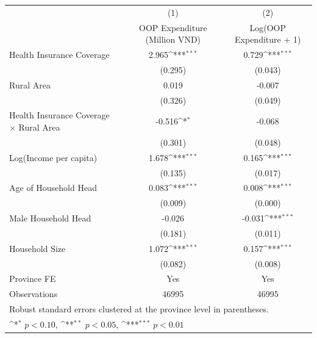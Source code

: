 {
\def\sym#1{\ifmmode^{#1}\else\(^{#1}\)\fi}
\begin{tabular}{l*{2}{c}}
\hline\hline
                    &\multicolumn{1}{c}{(1)}&\multicolumn{1}{c}{(2)}\\
                    &\multicolumn{1}{c}{OOP Expenditure (Million VND)}&\multicolumn{1}{c}{Log(OOP Expenditure + 1)}\\
\hline
Health Insurance Coverage&       2.965\sym{***}&       0.729\sym{***}\\
                    &     (0.295)         &     (0.043)         \\
[1em]
Rural Area          &       0.019         &      -0.007         \\
                    &     (0.326)         &     (0.049)         \\
[1em]
Health Insurance Coverage $\times$ Rural Area&      -0.516\sym{*}  &      -0.068         \\
                    &     (0.301)         &     (0.048)         \\
[1em]
Log(Income per capita)&       1.678\sym{***}&       0.165\sym{***}\\
                    &     (0.135)         &     (0.017)         \\
[1em]
Age of Household Head&       0.083\sym{***}&       0.008\sym{***}\\
                    &     (0.009)         &     (0.000)         \\
[1em]
Male Household Head &      -0.026         &      -0.031\sym{***}\\
                    &     (0.181)         &     (0.011)         \\
[1em]
Household Size      &       1.072\sym{***}&       0.157\sym{***}\\
                    &     (0.082)         &     (0.008)         \\
[1em]
Province FE         &         Yes         &         Yes         \\
\hline
Observations        &       46995         &       46995         \\
\hline\hline
\multicolumn{3}{l}{\footnotesize Robust standard errors clustered at the province level in parentheses.}\\
\multicolumn{3}{l}{\footnotesize \sym{*} \(p<0.10\), \sym{**} \(p<0.05\), \sym{***} \(p<0.01\)}\\
\end{tabular}
}
